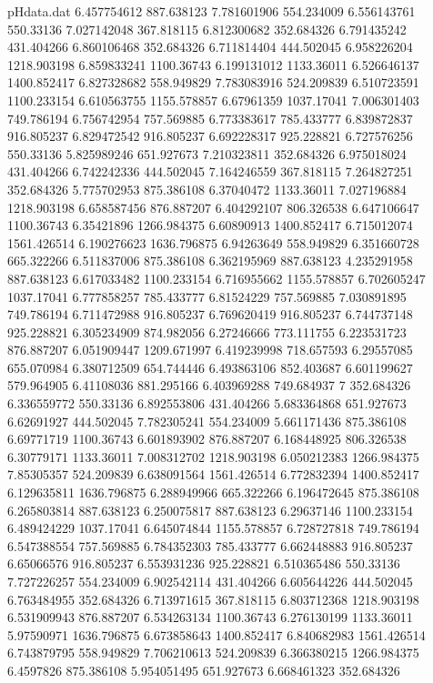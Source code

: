 \begin{filecontents}{pHdata.dat}
6.457754612	887.638123
7.781601906	554.234009
6.556143761	550.33136
7.027142048	367.818115
6.812300682	352.684326
6.791435242	431.404266
6.860106468	352.684326
6.711814404	444.502045
6.958226204	1218.903198
6.859833241	1100.36743
6.199131012	1133.36011
6.526646137	1400.852417
6.827328682	558.949829
7.783083916	524.209839
6.510723591	1100.233154
6.610563755	1155.578857
6.67961359	1037.17041
7.006301403	749.786194
6.756742954	757.569885
6.773383617	785.433777
6.839872837	916.805237
6.829472542	916.805237
6.692228317	925.228821
6.727576256	550.33136
5.825989246	651.927673
7.210323811	352.684326
6.975018024	431.404266
6.742242336	444.502045
7.164246559	367.818115
7.264827251	352.684326
5.775702953	875.386108
6.37040472	1133.36011
7.027196884	1218.903198
6.658587456	876.887207
6.404292107	806.326538
6.647106647	1100.36743
6.35421896	1266.984375
6.60890913	1400.852417
6.715012074	1561.426514
6.190276623	1636.796875
6.94263649	558.949829
6.351660728	665.322266
6.511837006	875.386108
6.362195969	887.638123
4.235291958	887.638123
6.617033482	1100.233154
6.716955662	1155.578857
6.702605247	1037.17041
6.777858257	785.433777
6.81524229	757.569885
7.030891895	749.786194
6.711472988	916.805237
6.769620419	916.805237
6.744737148	925.228821
6.305234909	874.982056
6.27246666	773.111755
6.223531723	876.887207
6.051909447	1209.671997
6.419239998	718.657593
6.29557085	655.070984
6.380712509	654.744446
6.493863106	852.403687
6.601199627	579.964905
6.41108036	881.295166
6.403969288	749.684937
7	352.684326
6.336559772	550.33136
6.892553806	431.404266
5.683364868	651.927673
6.62691927	444.502045
7.782305241	554.234009
5.661171436	875.386108
6.69771719	1100.36743
6.601893902	876.887207
6.168448925	806.326538
6.30779171	1133.36011
7.008312702	1218.903198
6.050212383	1266.984375
7.85305357	524.209839
6.638091564	1561.426514
6.772832394	1400.852417
6.129635811	1636.796875
6.288949966	665.322266
6.196472645	875.386108
6.265803814	887.638123
6.250075817	887.638123
6.29637146	1100.233154
6.489424229	1037.17041
6.645074844	1155.578857
6.728727818	749.786194
6.547388554	757.569885
6.784352303	785.433777
6.662448883	916.805237
6.65066576	916.805237
6.553931236	925.228821
6.510365486	550.33136
7.727226257	554.234009
6.902542114	431.404266
6.605644226	444.502045
6.763484955	352.684326
6.713971615	367.818115
6.803712368	1218.903198
6.531909943	876.887207
6.534263134	1100.36743
6.276130199	1133.36011
5.97590971	1636.796875
6.673858643	1400.852417
6.840682983	1561.426514
6.743879795	558.949829
7.706210613	524.209839
6.366380215	1266.984375
6.4597826	875.386108
5.954051495	651.927673
6.668461323	352.684326

\end{filecontents}
